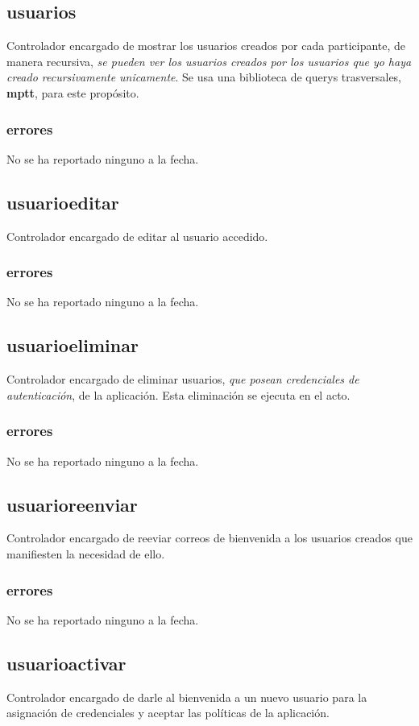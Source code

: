 \documentclass[10pt,a4paper]{book}
\begin{document}
	\subsection{usuarios}
	Controlador encargado de mostrar los usuarios creados por cada participante, de manera recursiva, \textit{se pueden ver los usuarios creados por los usuarios que yo haya creado recursivamente unicamente}. Se usa una biblioteca de querys trasversales, \textbf{mptt}, para este propósito.
	\subsubsection{errores}
	No se ha reportado ninguno a la fecha.

	\subsection{usuarioeditar}
	Controlador encargado de editar al usuario accedido.
	\subsubsection{errores}
	No se ha reportado ninguno a la fecha.

	\subsection{usuarioeliminar}
	Controlador encargado de eliminar usuarios, \textit{que posean credenciales de autenticación}, de la aplicación. Esta eliminación se ejecuta en el acto.
	\subsubsection{errores}
	No se ha reportado ninguno a la fecha.

	\subsection{usuarioreenviar}
	Controlador encargado de reeviar correos de bienvenida a los usuarios creados que manifiesten la necesidad de ello.
	\subsubsection{errores}
	No se ha reportado ninguno a la fecha.

	\subsection{usuarioactivar}
	Controlador encargado de darle al bienvenida a un nuevo usuario para la asignación de credenciales y aceptar las políticas de la aplicación.
\end{document}
